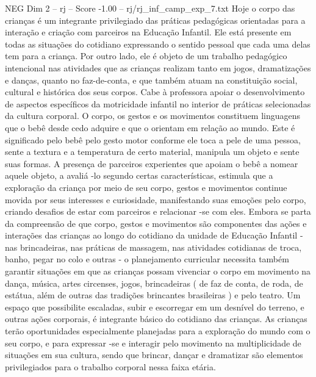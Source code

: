 \begin{textsample}{NEG Dim 2 – rj – Score -1.00 – rj/rj\_inf\_camp\_exp\_7.txt}
Hoje o corpo das crianças é um integrante privilegiado das práticas pedagógicas orientadas para a interação e criação com parceiros na Educação Infantil.
Ele está presente em todas as situações do cotidiano expressando o sentido pessoal que cada uma delas tem para a criança.
Por outro lado, ele é objeto de um trabalho pedagógico intencional nas atividades que as crianças realizam tanto em jogos, dramatizações e danças, quanto no faz-de-conta, e que também atuam na constituição social, cultural e histórica dos seus corpos.
Cabe à professora apoiar o desenvolvimento de aspectos específicos da motricidade infantil no interior de práticas selecionadas da cultura corporal.
O corpo, os gestos e os movimentos constituem linguagens que o bebê desde cedo adquire e que o orientam em relação ao mundo.
Este é significado pelo bebê pelo gesto motor conforme ele toca a pele de uma pessoa, sente a textura e a temperatura de certo material, manipula um objeto e sente suas formas.
A presença de parceiros experientes que apoiam o bebê a nomear aquele objeto, a avaliá -lo segundo certas características, estimula que a exploração da criança por meio de seu corpo, gestos e movimentos continue movida por seus interesses e curiosidade, manifestando suas emoções pelo corpo, criando desafios de estar com parceiros e relacionar -se com eles.
Embora se parta da compreensão de que corpo, gestos e movimentos são componentes das ações e interações das crianças ao longo do cotidiano da unidade de Educação Infantil - nas brincadeiras, nas práticas de massagem, nas atividades cotidianas de troca, banho, pegar no colo e outras - o planejamento curricular necessita também garantir situações em que as crianças possam vivenciar o corpo em movimento na dança, música, artes circenses, jogos, brincadeiras ( de faz de conta, de roda, de estátua, além de outras das tradições brincantes brasileiras ) e pelo teatro.
Um espaço que possibilite escaladas, subir e escorregar em um desnível do terreno, e outras ações corporais, é integrante básico do cotidiano das crianças.
As crianças terão oportunidades especialmente planejadas para a exploração do mundo com o seu corpo, e para expressar -se e interagir pelo movimento na multiplicidade de situações em sua cultura, sendo que brincar, dançar e dramatizar são elementos privilegiados para o trabalho corporal nessa faixa etária.

\end{textsample}
